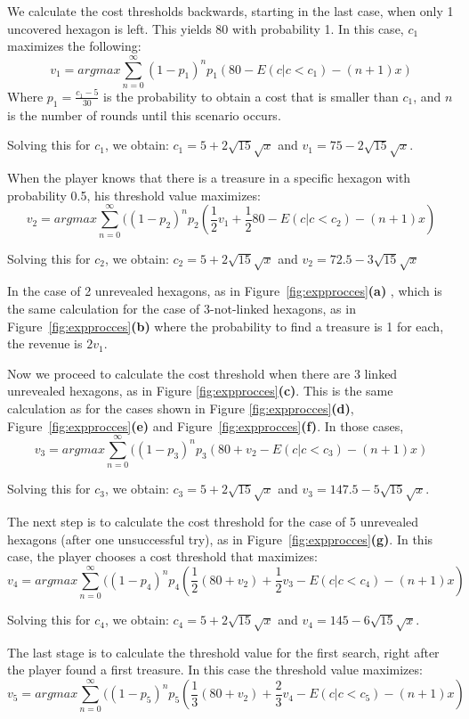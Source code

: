 We calculate the cost thresholds backwards, starting in the last case, when only 1 uncovered hexagon is left. This yields 80 with probability 1. In this case, $c_1$ maximizes the following:
$$v_1=argmax\sum_{n=0}^\infty(1-p_1)^np_1(80-E(c|c<c_1)-(n+1)x)$$
Where $p_1=\frac{c_1-5}{30}$ is the probability to obtain a cost that is smaller than $c_1$, and $n$ is the number of rounds until this scenario occurs.

Solving this for $c_1$, we obtain: $c_1=5+2\sqrt{15}\sqrt{x}$ and $v_1=75-2\sqrt{15}\sqrt{x}$.

When the player knows that there is a treasure in a specific hexagon with probability 0.5, his threshold value maximizes:
$$v_2=argmax\sum_{n=0}^\infty((1-p_2)^np_2(\frac{1}{2}v_1 + \frac{1}{2} 80-E(c|c<c_2)-(n+1)x)$$

Solving this for $c_2$, we obtain: $c_2=5+2\sqrt{15}\sqrt{x}$ and $v_2=72.5-3\sqrt{15}\sqrt{x}$

In the case of 2 unrevealed hexagons, as in Figure~\ref{fig:expprocces}\textbf{(a)} , which is the same calculation for the case of 3-not-linked hexagons, as in Figure~\ref{fig:expprocces}\textbf{(b)} where the probability to find a treasure is 1 for each, the revenue is $2v_1$. 

Now we proceed to calculate the cost threshold when there are 3 linked unrevealed hexagons, as in Figure \ref{fig:expprocces}\textbf{(c)}. This is the same calculation as for the cases shown in Figure \ref{fig:expprocces}\textbf{(d)}, Figure~\ref{fig:expprocces}\textbf{(e)} and Figure~\ref{fig:expprocces}\textbf{(f)}. In those cases, $$v_3=argmax\sum_{n=0}^\infty((1-p_3)^np_3(80+v_2-E(c|c<c_3)-(n+1)x)$$

Solving this for $c_3$, we obtain: $c_3=5+2\sqrt{15}\sqrt{x}$ and $v_3=147.5-5\sqrt{15}\sqrt{x}$.

The next step is to calculate the cost threshold for the case of 5 unrevealed hexagons (after one unsuccessful try), as in Figure~\ref{fig:expprocces}\textbf{(g)}. In this case, the player chooses a cost threshold that maximizes:
$$v_4=argmax\sum_{n=0}^\infty((1-p_4)^np_4(\frac{1}{2}(80+v_2)+\frac{1}{2}v_3-E(c|c<c_4)-(n+1)x)$$

Solving this for $c_4$, we obtain: $c_4=5+2\sqrt{15}\sqrt{x}$ and $v_4=145-6\sqrt{15}\sqrt{x}$.

The last stage is to calculate the threshold value for the first search, right after the player found a first treasure. In this case the threshold value maximizes:
$$v_5=argmax\sum_{n=0}^\infty((1-p_5)^np_5(\frac{1}{3}(80+v_2)+\frac{2}{3}v_4-E(c|c<c_5)-(n+1)x)$$

